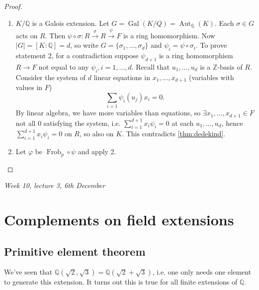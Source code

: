 \documentclass{article}
\newcommand{\Z}{\mathbb{Z}}
\newcommand{\Q}{\mathbb{Q}}
\newcommand{\Aut}{\operatorname{Aut}}
\newcommand{\Gal}{\operatorname{Gal}}
\newcommand{\Frob}{\operatorname{Frob}}
\theoremstyle{definition}
\begin{document}
\begin{proof}
\begin{enumerate}
\item $K/\Q$ is a Galois extension. Let $G=\Gal(K/Q)=\Aut_\Q(K)$. Each $\sigma\in G$ acts on $R$. Then $\psi\circ\sigma:R\xrightarrow{\sigma}R\xrightarrow{\psi}F$ is a ring homomorphism. Now $|G|=[K:\Q]=d$, so write $G=\{\sigma_1,\ldots,\sigma_d\}$ and $\psi_i=\psi\circ\sigma_i$. To prove statement 2, for a contradiction suppose $\psi_{d+1}$ is a ring homomorphism $R\rightarrow F$ not equal to any $\psi_i,i=1,\ldots,d$. Recall that $u_1,\ldots,u_d$ is a $\Z$-basis of $R$. Consider the system of $d$ linear equations in $x_1,\ldots,x_{d+1}$ (variables with values in $F$)
\[
\sum_{i=1}\psi_i(u_j)x_i=0.
\]
By linear algebra, we have more variables than equations, so $\exists x_1,\ldots,x_{d+1}\in F$ not all 0 satisfying the system, i.e. $\sum_{i=1}^{d+1}x_i\psi_i=0$ at each $u_1,\ldots,u_d$, hence $\sum_{i=1}^{d+1}x_i\psi_i=0$ on $R$, so also on $K$. This contradicts \ref{thm:dedekind}.

\item Let $\varphi$ be $\Frob_p\circ\psi$ and apply 2.
\end{enumerate}
\end{proof}

\begin{flushright}
\textit{Week 10, lecture 3, 6th December}
\end{flushright}

\section{Complements on field extensions}
\subsection{Primitive element theorem}
We've seen that $\Q(\sqrt 2,\sqrt 3)=\Q(\sqrt 2+\sqrt 3)$, i.e. one only needs one element to generate this extension. It turns out this is true for all finite extensions of $\Q$.
\end{document}
